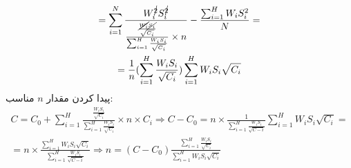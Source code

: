 \begin{enumerate}
\begin{multline*}
			=\sum_{i=1}^{N}\frac{W_i^{\cancel{2}}S_i^{\cancel{2}}}
			{\frac{\frac{\cancel{W_i}\cancel{S_i}}{\sqrt{C_i}}}{\sum_{i=1}^{H}\frac{W_iS_i}{\sqrt{C_i}}}\times n}
			-\frac{\sum_{i=1}^{H}W_iS_i^2}{N}
			=\\=
			\frac{1}{n}(\sum_{i=1}^{H}\frac{W_iS_i}{\sqrt{C_i}})\sum_{i=1}^{H}W_i S_i \sqrt{C_i}
		\end{multline*}
		پیدا کردن مقدار 
		$n$
		مناسب:
		\begin{multline*}
			C=C_0+\sum_{i=1}^{H}\frac{\frac{W_iS_i}{\sqrt{C_i}}}{\sum_{i=1}^{H}\frac{W_iS_i}{\sqrt{C_i}}}\times n\times C_i
			\Rightarrow C-C_0=n\times \frac{1}{\sum_{i=1}^{H}\frac{W_iS_i}{\sqrt{C-i}}}\sum_{i=1}^{H}W_iS_i\sqrt{C_i}
			=\\=
			n\times\frac{\sum_{i=1}^{H}W_iS_i\sqrt{C_i}}{\sum_{i=1}^{H}\frac{W_iS_i}{\sqrt{C-i}}}
			\Rightarrow n=(C-C_0)\frac{\sum_{i=1}^{H}\frac{W_iS_i}{\sqrt{C_i}}}{\sum_{i=1}^{H}W_iS_i\sqrt{C_i}}
		\end{multline*}
\end{enumerate}
